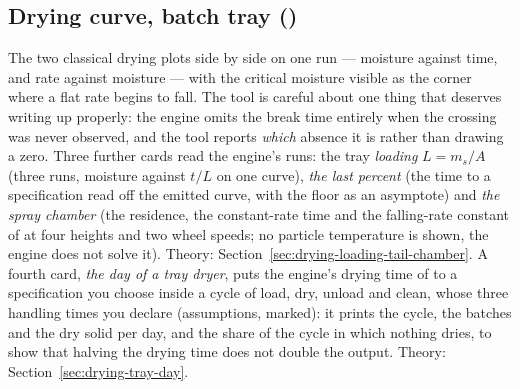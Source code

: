 \documentclass[11pt,a4paper]{article}
\begin{document}
\subsection*{Drying curve, batch tray \quad()}
The two classical drying plots side by side on one run --- moisture
against time, and rate against moisture --- with the critical moisture
visible as the corner where a flat rate begins to fall.  The tool is
careful about one thing that deserves writing up properly: the engine
omits the break time entirely when the crossing was never observed, and
the tool reports \emph{which} absence it is rather than drawing a zero.
Three further cards read the engine's runs: the tray \emph{loading} $L=m_s/A$ (three runs, moisture against $t/L$ on one curve),
\emph{the last percent} (the time to a specification read off the emitted curve, with the floor as an asymptote) and
\emph{the spray chamber} (the residence, the constant-rate time and the falling-rate constant of 
at four heights and two wheel speeds; no particle temperature is shown, the engine does not solve it).  Theory:
Section~\ref{sec:drying-loading-tail-chamber}.
A fourth card, \emph{the day of a tray dryer}, puts the engine's drying time of  to a specification you choose
inside a cycle of load, dry, unload and clean, whose three handling times you declare (assumptions, marked): it prints the cycle, the batches
and the dry solid per day, and the share of the cycle in which nothing dries, to show that halving the drying time does not double the output.
Theory: Section~\ref{sec:drying-tray-day}.
\end{document}
